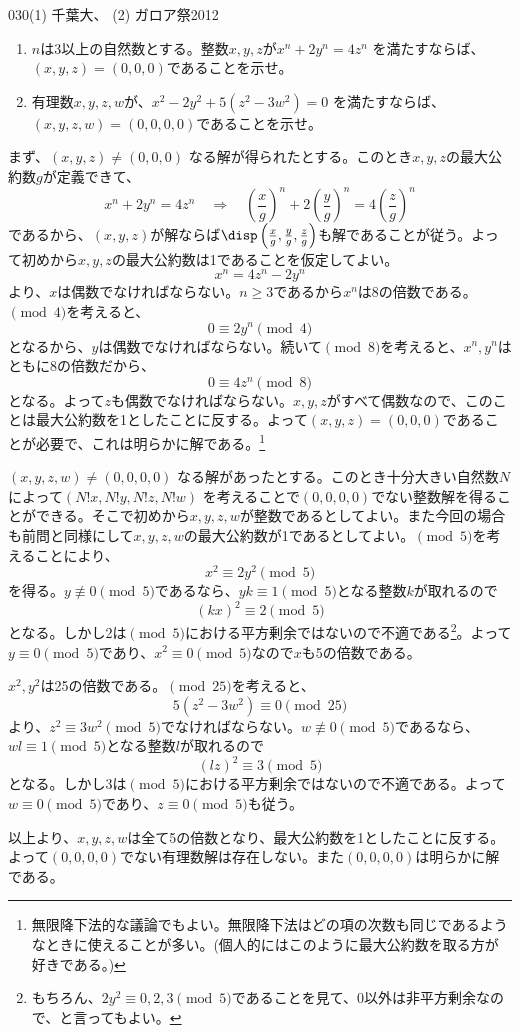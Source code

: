 \begin{prob}{030}{}{(1) 千葉大、 (2) ガロア祭2012}
 \begin{enumerate}
  \item $n$は3以上の自然数とする。整数$x,y,z$が$x^n+2y^n=4z^n$ を満たすならば、$(x,y,z)=(0,0,0)$であることを示せ。
  \item 有理数$x,y,z,w$が、$x^2-2y^2+5(z^2-3w^2)=0$ を満たすならば、$(x,y,z,w)=(0,0,0,0)$であることを示せ。
 \end{enumerate}
\end{prob}
まず、$(x, y, z)\neq (0,0,0)$ なる解が得られたとする。このとき$x,y,z$の最大公約数$g$が定義できて、
\[ x^n+2y^n=4z^n \quad\Rightarrow\quad \left(\frac{x}{g}\right)^n+2\left(\frac{y}{g}\right)^n=4\left(\frac{z}{g}\right)^n \]
であるから、$(x,y,z)$が解ならば$\disp\left(\frac{x}{g},\frac{y}{g},\frac{z}{g}\right)$も解であることが従う。よって初めから$x,y,z$の最大公約数は1であることを仮定してよい。
\[ x^n=4z^n-2y^n \]
より、$x$は偶数でなければならない。$n\ge 3$であるから$x^n$は8の倍数である。$\pmod{4}$を考えると、
\[ 0\equiv 2y^n \pmod{4} \]
となるから、$y$は偶数でなければならない。続いて$\pmod{8}$を考えると、$x^n, y^n$はともに8の倍数だから、
\[ 0\equiv 4z^n \pmod{8} \]
となる。よって$z$も偶数でなければならない。$x,y,z$がすべて偶数なので、このことは最大公約数を1としたことに反する。よって$(x,y,z)=(0,0,0)$であることが必要で、これは明らかに解である。\footnote{無限降下法的な議論でもよい。無限降下法はどの項の次数も同じであるようなときに使えることが多い。(個人的にはこのように最大公約数を取る方が好きである。)}

$(x,y,z,w)\neq(0,0,0,0)$ なる解があったとする。このとき十分大きい自然数$N$によって$(N!x,N!y,N!z,N!w)$ を考えることで$(0,0,0,0)$でない整数解を得ることができる。そこで初めから$x,y,z,w$が整数であるとしてよい。また今回の場合も前問と同様にして$x,y,z,w$の最大公約数が1であるとしてよい。$\pmod{5}$を考えることにより、
\[ x^2\equiv 2y^2 \pmod{5} \]
を得る。$y\not\equiv 0 \pmod{5}$であるなら、$yk\equiv 1 \pmod{5}$となる整数$k$が取れるので
\[ (kx)^2\equiv 2 \pmod{5} \]
となる。しかし2は$\pmod{5}$における平方剰余ではないので不適である\footnote{もちろん、$2y^2\equiv 0,2,3 \pmod{5}$であることを見て、0以外は非平方剰余なので、と言ってもよい。}。よって$y\equiv 0\pmod{5}$であり、$x^2\equiv 0\pmod{5}$なので$x$も5の倍数である。

$x^2,y^2$は25の倍数である。$\pmod{25}$を考えると、
\[ 5(z^2-3w^2) \equiv 0 \pmod{25} \]
より、$z^2\equiv 3w^2 \pmod{5}$でなければならない。$w\not\equiv 0\pmod{5}$であるなら、$wl\equiv 1 \pmod{5}$となる整数$l$が取れるので
\[ (lz)^2\equiv 3 \pmod{5} \]
となる。しかし3は$\pmod{5}$における平方剰余ではないので不適である。よって$w\equiv 0\pmod{5}$であり、$z\equiv 0\pmod{5}$も従う。

以上より、$x,y,z,w$は全て5の倍数となり、最大公約数を1としたことに反する。よって$(0,0,0,0)$でない有理数解は存在しない。また$(0,0,0,0)$は明らかに解である。